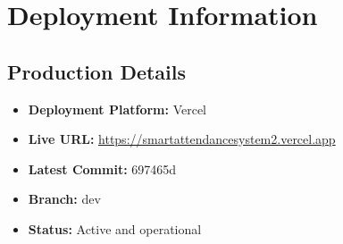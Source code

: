 \documentclass[11pt, a4paper]{report}
\begin{document}
\chapter{Deployment Information}

\section{Production Details}

\begin{itemize}
    \item \textbf{Deployment Platform:} Vercel
    \item \textbf{Live URL:} \url{https://smartattendancesystem2.vercel.app}
    \item \textbf{Latest Commit:} 697465d
    \item \textbf{Branch:} dev
    \item \textbf{Status:} Active and operational
\end{itemize}
\end{document}
